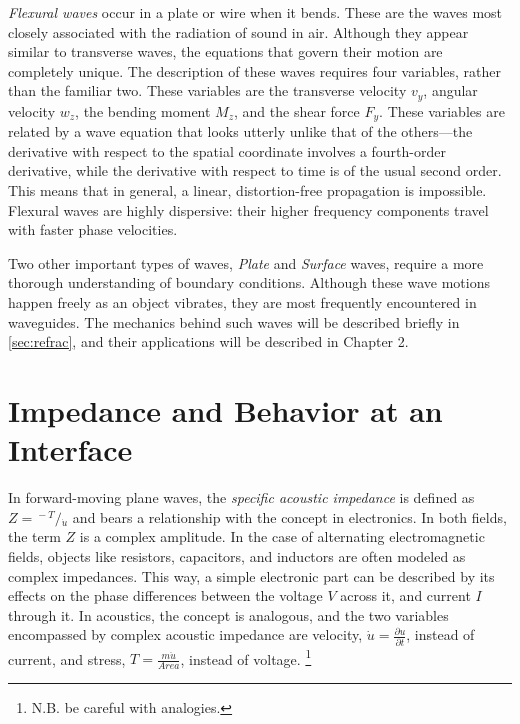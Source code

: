 \documentclass[a4paper,10pt]{report}
\numberwithin{equation}{section}
\begin{document}
\emph{Flexural waves} occur in a plate or wire when it bends. These are the waves most closely associated with the radiation of sound in air. Although they appear similar to transverse waves, the equations that govern their motion are completely unique. The description of these waves requires four variables, rather than the familiar two. These variables are the transverse velocity $v_y$, angular velocity $w_z$, the bending moment $M_z$, and the shear force $F_y$. These variables are related by a wave equation that looks utterly unlike that of the others---the derivative with respect to the spatial coordinate involves a fourth-order derivative, while the derivative with respect to time is of the usual second order. This means that in general, a linear, distortion-free propagation is impossible. Flexural waves are highly dispersive: their higher frequency components travel with faster phase velocities. \cite[p.~95]{Cremer1973}

Two other important types of waves, \emph{Plate} and \emph{Surface} waves, require a more thorough understanding of boundary conditions. Although these wave motions happen freely as an object vibrates, they are most frequently encountered in waveguides. The mechanics behind such waves will be described briefly in \ref{sec:refrac}, and their applications will be described in Chapter 2.



\section{Impedance and Behavior at an Interface}\label{sec:impedance}
In forward-moving plane waves, the \emph{specific acoustic impedance} is defined as $Z = {}^{{}{}-T}/{}_{\dot{u}}$ and bears a relationship with the concept in electronics. In both fields, the term $Z$ is a complex amplitude. In the case of alternating electromagnetic fields, objects like resistors, capacitors, and inductors are often modeled as complex impedances. This way, a simple electronic part can be described by its effects on the phase differences between the voltage $V$ across it, and current $I$ through it.\cite[p.~168]{scherz07} In acoustics, the concept is analogous, and the two variables encompassed by complex acoustic impedance are velocity, $\dot{u} = \frac{\partial u}{\partial t}$, instead of current, and stress, $T = \frac{m\ddot{u}}{Area}$, instead of voltage.\cite[p.~9]{Cremer1973} \footnote{ N.B. be careful with analogies.}
\end{document}
